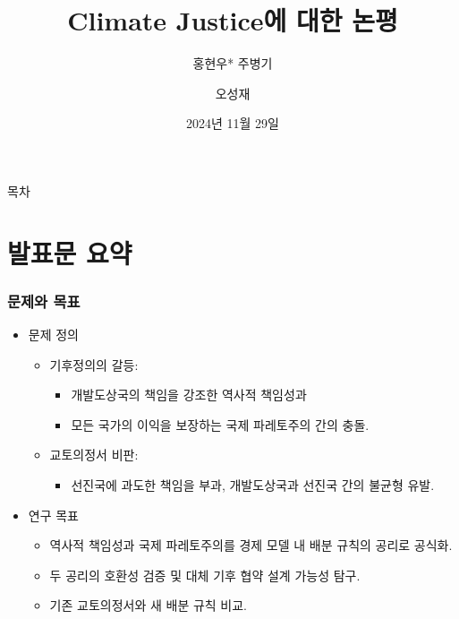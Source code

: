 \documentclass[aspectratio=169,xcolor=dvipsnames,handout]{beamer}
\title{Climate Justice에 대한 논평}
\subtitle{홍현우* 주병기}
\author{오성재}
\institute[CNU]
    {\relax
        한국경제학회 충청지회·한국지역정책학회 추계학술대회
    }
\date{2024년 11월 29일}
\begin{document}

\frame{\titlepage}

\begin{frame}{목차}
    \tableofcontents
\end{frame}

\section{발표문 요약}

\begin{frame}
    \frametitle{문제와 목표}
    \begin{itemize}[<+->]
        \item 문제 정의
        \begin{itemize}
            \item 기후정의의 갈등:
            \begin{itemize}
               \item 개발도상국의 책임을 강조한 역사적 책임성과
               \item 모든 국가의 이익을 보장하는 국제 파레토주의 간의 충돌.
            \end{itemize}
            \item 교토의정서 비판:
            \begin{itemize}
               \item 선진국에 과도한 책임을 부과, 개발도상국과 선진국 간의 불균형 유발.
            \end{itemize}
        \end{itemize}
        \item 연구 목표
        \begin{itemize}
            \item 역사적 책임성과 국제 파레토주의를 경제 모델 내 배분 규칙의 공리로 공식화.
            \item 두 공리의 호환성 검증 및 대체 기후 협약 설계 가능성 탐구.
            \item 기존 교토의정서와 새 배분 규칙 비교.
        \end{itemize}
    \end{itemize}
\end{frame}
\end{document}
